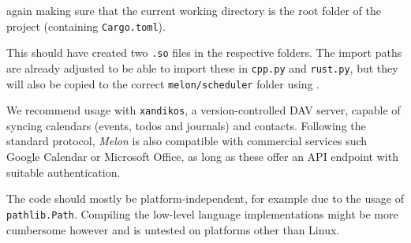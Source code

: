 again making sure that the current working directory is the root folder of the project (containing \texttt{Cargo.toml}).

This should have created two \texttt{.so} files in the respective folders.
The import paths are already adjusted to be able to import these in \texttt{cpp.py} and \texttt{rust.py}, but they will also be copied to the correct \texttt{melon/scheduler} folder using .

We recommend usage with \texttt{xandikos}, a version-controlled DAV server, capable of syncing calendars (events, todos and journals) and contacts.
Following the standard protocol, \textit{Melon} is also compatible with commercial services such Google Calendar or Microsoft Office, as long as these offer an API endpoint with suitable authentication.

The code should mostly be platform-independent, for example due to the usage of \texttt{pathlib.Path}. Compiling the low-level language implementations might be more cumbersome however and is untested on platforms other than Linux.
